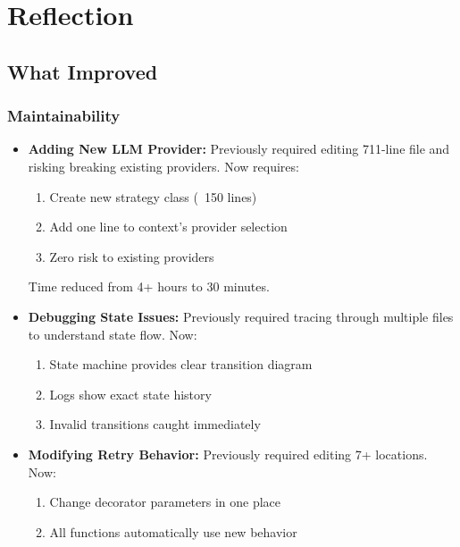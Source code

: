 \documentclass[11pt,a4paper]{article}
\begin{document}
\newpage

\section{Reflection}

\subsection{What Improved}

\subsubsection{Maintainability}

\begin{itemize}
    \item \textbf{Adding New LLM Provider:} Previously required editing 711-line file and risking breaking existing providers. Now requires:
    \begin{enumerate}
        \item Create new strategy class (~150 lines)
        \item Add one line to context's provider selection
        \item Zero risk to existing providers
    \end{enumerate}
    Time reduced from 4+ hours to 30 minutes.

    \item \textbf{Debugging State Issues:} Previously required tracing through multiple files to understand state flow. Now:
    \begin{enumerate}
        \item State machine provides clear transition diagram
        \item Logs show exact state history
        \item Invalid transitions caught immediately
    \end{enumerate}

    \item \textbf{Modifying Retry Behavior:} Previously required editing 7+ locations. Now:
    \begin{enumerate}
        \item Change decorator parameters in one place
        \item All functions automatically use new behavior
    \end{enumerate}
\end{itemize}
\end{document}
